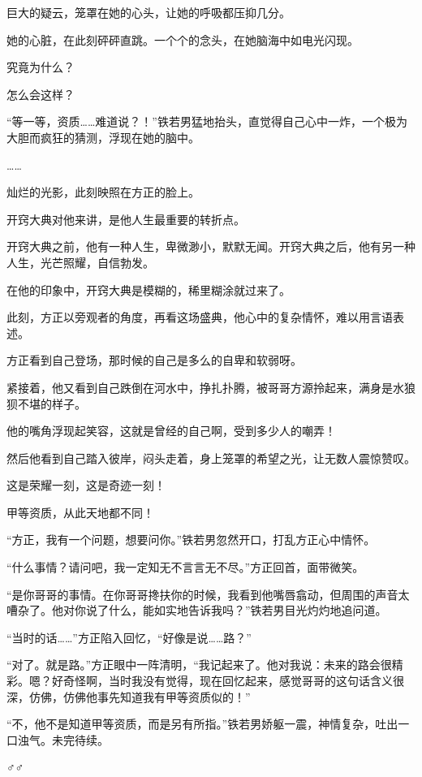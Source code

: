 \begin{this_body}
巨大的疑云，笼罩在她的心头，让她的呼吸都压抑几分。

她的心脏，在此刻砰砰直跳。一个个的念头，在她脑海中如电光闪现。

究竟为什么？

怎么会这样？

“等一等，资质……难道说？！”铁若男猛地抬头，直觉得自己心中一炸，一个极为大胆而疯狂的猜测，浮现在她的脑中。

……

灿烂的光影，此刻映照在方正的脸上。

开窍大典对他来讲，是他人生最重要的转折点。

开窍大典之前，他有一种人生，卑微渺小，默默无闻。开窍大典之后，他有另一种人生，光芒照耀，自信勃发。

在他的印象中，开窍大典是模糊的，稀里糊涂就过来了。

此刻，方正以旁观者的角度，再看这场盛典，他心中的复杂情怀，难以用言语表述。

方正看到自己登场，那时候的自己是多么的自卑和软弱呀。

紧接着，他又看到自己跌倒在河水中，挣扎扑腾，被哥哥方源拎起来，满身是水狼狈不堪的样子。

他的嘴角浮现起笑容，这就是曾经的自己啊，受到多少人的嘲弄！

然后他看到自己踏入彼岸，闷头走着，身上笼罩的希望之光，让无数人震惊赞叹。

这是荣耀一刻，这是奇迹一刻！

甲等资质，从此天地都不同！

“方正，我有一个问题，想要问你。”铁若男忽然开口，打乱方正心中情怀。

“什么事情？请问吧，我一定知无不言言无不尽。”方正回首，面带微笑。

“是你哥哥的事情。在你哥哥搀扶你的时候，我看到他嘴唇翕动，但周围的声音太嘈杂了。他对你说了什么，能如实地告诉我吗？”铁若男目光灼灼地追问道。

“当时的话……”方正陷入回忆，“好像是说……路？”

“对了。就是路。”方正眼中一阵清明，“我记起来了。他对我说：未来的路会很精彩。嗯？好奇怪啊，当时我没有觉得，现在回忆起来，感觉哥哥的这句话含义很深，仿佛，仿佛他事先知道我有甲等资质似的！”

“不，他不是知道甲等资质，而是另有所指。”铁若男娇躯一震，神情复杂，吐出一口浊气。未完待续。

♂♂

\end{this_body}

